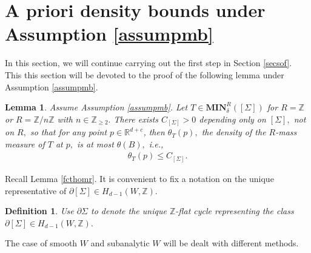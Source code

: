 \documentclass[11pt,a4paper]{amsart}
\numberwithin{equation}{section}
\newcommand{\mn}{\mathbf{MIN}}
\newcommand{\de}{\delta}
\newcommand{\Si}{\Sigma}
\newcommand{\pd}{\partial}
\newcommand{\R}{\mathbb{R}}
\newcommand{\Z}{\mathbb{Z}}
\theoremstyle{plain}
\newtheorem{lem}{Lemma}[subsection]
\newtheorem{defn}{Definition}[subsection]
\theoremstyle{definition}
\numberwithin{equation}{subsection}
\begin{document}
\section{A priori density bounds under Assumption \ref{assumpmb}}\label{secmonb}
In this section, we will continue carrying out the first step in Section \ref{secsof}. This this section will be devoted to the proof of the following lemma under Assumption \ref{assumpmb}.\begin{lem}\label{lemmondstb}
Assume Assumption \ref{assumpmb}.	Let $T\in\mn^R_\de([\Si])$ for $R=\Z$ or $R=\Z/n\Z$ with $n\in\Z_{\ge 2}.$ There exists $C_{[\Si]}>0$ depending only on $[\Si],$ not on $R,$ so that for any point $p\in\R^{d+c}$, then $\theta_T(p),$ the density of the $R$-mass measure of $T$ at $p,$ is at most $\theta(B),$ i.e.,
	\begin{align}\label{equfdst}
		\theta_T(p)\le C_{[\Si]}.
	\end{align} 
\end{lem}
Recall Lemma \ref{fcthomr}. It is convenient to fix a notation on the unique representative of $\pd[\Si]\in H_{d-1}(W,\Z).$
\begin{defn}
	Use $\pd\Si$ to denote the unique $\Z$-flat cycle representing the class  $\pd[\Si]\in H_{d-1}(W,\Z).$
\end{defn}
The case of smooth $W$ and subanalytic $W$ will be dealt with different methods. 
\end{document}
